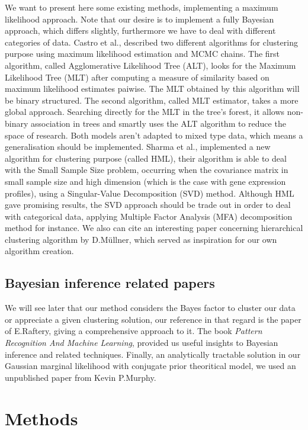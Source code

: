\documentclass[twocolumn,12pt]{article}
\begin{document}
We want to present here some existing methods, implementing a maximum likelihood approach. Note that our desire is to implement a fully Bayesian approach, which differs slightly, furthermore we have to deal with different categories of data.
Castro et al.\cite{castro}, described two different algorithms for clustering purpose using maximum likelihood estimation and MCMC chains. The first algorithm, called Agglomerative Likelihood Tree (ALT), looks for the Maximum Likelihood Tree (MLT) after computing a measure of similarity based on maximum likelihood estimates paiwise.
The MLT obtained by this algorithm will be binary structured.
The second algorithm, called MLT estimator, takes a more global approach.
Searching directly for the MLT in the tree's forest, it allows non-binary association in trees and smartly uses the ALT algorithm to reduce the space of research. 
Both models aren't adapted to mixed type data, which means a generalisation should be implemented.
Sharma et al.\cite{sharma}, implemented a new algorithm for clustering purpose (called HML), their algorithm is able to deal with the Small Sample Size problem, occurring when the covariance matrix in small sample size and high dimension (which is the case with gene expression profiles), using a Singular-Value Decomposition (SVD) method.
Although HML gave promising results, the SVD approach should be trade out in order to deal with categorical data, applying Multiple Factor Analysis (MFA)\cite{pages} decomposition method for instance.
We also can cite an interesting paper concerning hierarchical clustering algorithm by D.Müllner\cite{mullner}, which served as inspiration for our own algorithm creation.

\subsection{Bayesian inference related papers}

We will see later that our method considers the Bayes factor to cluster our data or appreciate a given clustering solution, our reference in that regard is the paper of E.Raftery\cite{raftery}, giving a comprehensive approach to it.
The book \emph{Pattern Recognition And Machine Learning}\cite{bishop}, provided us useful insights to Bayesian inference and related techniques.
Finally, an analytically tractable solution in our Gaussian marginal likelihood with conjugate prior theoritical model, we used an unpublished paper from Kevin P.Murphy\cite{murphy}.

\section{Methods}
\end{document}
